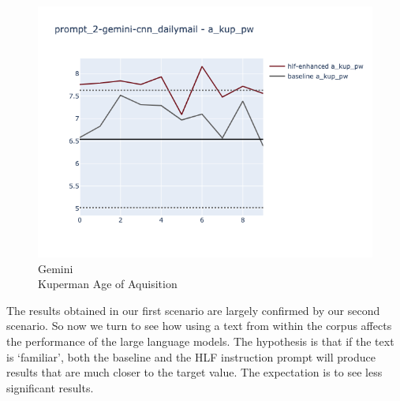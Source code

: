\documentclass[runningheads,a4paper,11pt]{article}
\begin{document}
\begin{figure}[ht!]
\begin{minipage}{0.32\textwidth}
        \label{fig-p2-command-r-simpttr}
    \end{minipage}
    \hfill
    \begin{minipage}{0.32\textwidth}
        \includegraphics[width=\linewidth]{plots/prompt_2/prompt_2-gemini-cnn_dailymail/prompt_2-gemini-cnn_dailymail_a_kup_pw.png}
        \caption[center]{Gemini\\Kuperman Age of Aquisition}
        \label{fig-p2-gemini-a-kup-pw}
    \end{minipage}
\end{figure}

The results obtained in our first scenario are largely confirmed by our second
scenario.
So now we turn to see how using a text from within the corpus affects the
performance of the large language models.
The hypothesis is that if the text is `familiar', both the baseline and the HLF
instruction prompt will produce results that are much closer to the target
value.
The expectation is to see less significant results.
\end{document}
